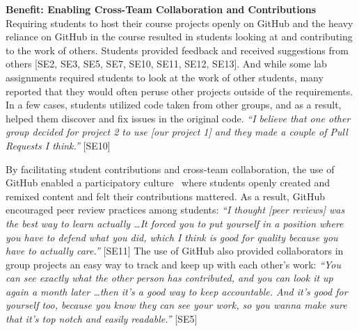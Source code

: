 
\textbf{Benefit: Enabling Cross-Team Collaboration and Contributions}\\
Requiring students to host their course projects openly on GitHub and the heavy reliance on GitHub in the course resulted in students looking at and contributing to the work of others. Students provided feedback and received suggestions from others [SE2, SE3, SE5, SE7, SE10, SE11, SE12, SE13]. And while some lab assignments required students to look at the work of other students, many reported that they would often peruse other projects outside of the requirements. In a few cases, students utilized code taken from other groups, and as a result, helped them discover and fix issues in the original code. \textit{``I believe that one other group decided for project 2 to use [our project 1] and they made a couple of Pull Requests I think.''} [SE10]

By facilitating student contributions and cross-team collaboration, the use of GitHub enabled a participatory culture~\cite{jenkins2009confronting} where students openly created and remixed content and felt their contributions mattered. As a result, GitHub encouraged peer review practices among students: \textit{``I thought [peer reviews] was the best way to learn actually \ldots It forced you to put yourself in a position where you have to defend what you did, which I think is good for quality because you have to actually care.''} [SE11] The use of GitHub also provided collaborators in group projects an easy way to track and keep up with each other's work: \textit{``You can see exactly what the other person has contributed, and you can look it up again a month later \ldots then it's a good way to keep accountable. And it's good for yourself too, because you know they can see your work, so you wanna make sure that it's top notch and easily readable.''} [SE5]

